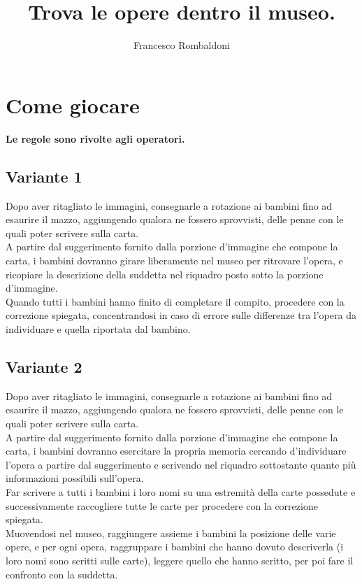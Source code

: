 \documentclass[hidelinks,12pt,a4paper]{article}
\begin{document}
	
	\title{\textbf{\\Trova le opere dentro il museo.}}
	\author{Francesco Rombaldoni}
	\date{}
	
	\maketitle
	\newpage
	
	\tableofcontents
	\newpage
	
	\section{Come giocare}
	\begin{center}
		\textbf{Le regole sono rivolte agli operatori.}
	\end{center}
	
	\subsection{Variante 1}
	Dopo aver ritagliato le immagini, consegnarle a rotazione ai bambini fino ad esaurire il mazzo, aggiungendo qualora ne fossero sprovvisti, delle penne con le quali poter scrivere sulla carta.\\
	A partire dal suggerimento fornito dalla porzione d'immagine che compone la carta, i bambini dovranno girare liberamente nel museo per ritrovare l'opera, e ricopiare la descrizione della suddetta nel riquadro posto sotto la porzione d'immagine.\\
	Quando tutti i bambini hanno finito di completare il compito, procedere con la correzione spiegata, concentrandosi in caso di errore sulle differenze tra l'opera da individuare e quella riportata dal bambino.
	
	\subsection{Variante 2}
	Dopo aver ritagliato le immagini, consegnarle a rotazione ai bambini fino ad esaurire il mazzo, aggiungendo qualora ne fossero sprovvisti, delle penne con le quali poter scrivere sulla carta.\\
	A partire dal suggerimento fornito dalla porzione d'immagine che compone la carta, i bambini dovranno esercitare la propria memoria cercando d'individuare l'opera a partire dal suggerimento e scrivendo nel riquadro sottostante quante più informazioni possibili sull'opera.\\
	Far scrivere a tutti i bambini i loro nomi su una estremità della carte possedute e successivamente raccogliere tutte le carte per procedere con la correzione spiegata.\\
	 Muovendosi nel museo, raggiungere assieme i bambini la posizione delle varie opere, e per ogni opera, raggruppare i bambini che hanno dovuto descriverla (i loro nomi sono scritti sulle carte), leggere quello che hanno scritto, per poi fare il confronto con la suddetta.
	
\end{document}
